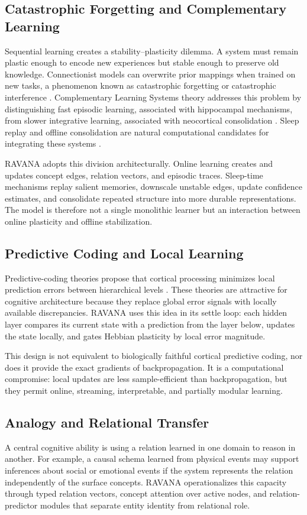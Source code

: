 \documentclass[11pt]{article}
\begin{document}
\subsection{Catastrophic Forgetting and Complementary Learning}
Sequential learning creates a stability--plasticity dilemma. A system must remain plastic enough to encode new experiences but stable enough to preserve old knowledge. Connectionist models can overwrite prior mappings when trained on new tasks, a phenomenon known as catastrophic forgetting or catastrophic interference \cite{mccloskey1989,french1999}. Complementary Learning Systems theory addresses this problem by distinguishing fast episodic learning, associated with hippocampal mechanisms, from slower integrative learning, associated with neocortical consolidation \cite{mcclelland1995,kumaran2016}. Sleep replay and offline consolidation are natural computational candidates for integrating these systems \cite{wilson1994,ji2007,diekelmann2010}.

RAVANA adopts this division architecturally. Online learning creates and updates concept edges, relation vectors, and episodic traces. Sleep-time mechanisms replay salient memories, downscale unstable edges, update confidence estimates, and consolidate repeated structure into more durable representations. The model is therefore not a single monolithic learner but an interaction between online plasticity and offline stabilization.

\subsection{Predictive Coding and Local Learning}
Predictive-coding theories propose that cortical processing minimizes local prediction errors between hierarchical levels \cite{friston2010}. These theories are attractive for cognitive architecture because they replace global error signals with locally available discrepancies. RAVANA uses this idea in its settle loop: each hidden layer compares its current state with a prediction from the layer below, updates the state locally, and gates Hebbian plasticity by local error magnitude.

This design is not equivalent to biologically faithful cortical predictive coding, nor does it provide the exact gradients of backpropagation. It is a computational compromise: local updates are less sample-efficient than backpropagation, but they permit online, streaming, interpretable, and partially modular learning.

\subsection{Analogy and Relational Transfer}
A central cognitive ability is using a relation learned in one domain to reason in another. For example, a causal schema learned from physical events may support inferences about social or emotional events if the system represents the relation independently of the surface concepts. RAVANA operationalizes this capacity through typed relation vectors, concept attention over active nodes, and relation-predictor modules that separate entity identity from relational role.
\end{document}
